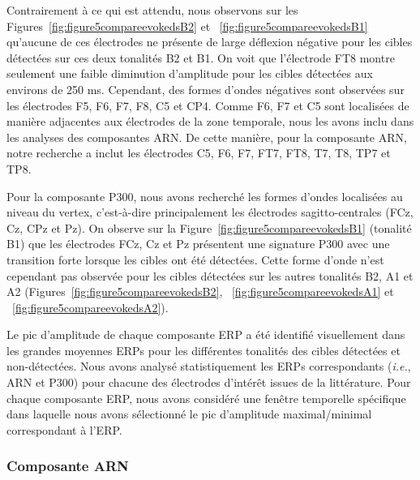 Contrairement à ce qui est attendu, nous observons sur les Figures~\ref{fig:figure5compareevokedsB2} et ~\ref{fig:figure5compareevokedsB1} qu'aucune de ces électrodes ne présente de large déflexion négative pour les cibles détectées sur ces deux tonalités B2 et B1. 
On voit que l'électrode FT8 montre seulement une faible diminution d'amplitude pour les cibles détectées aux environs de 250 ms. 
Cependant, des formes d'ondes négatives sont observées sur les électrodes F5, F6, F7, F8, C5 et CP4.  
Comme F6, F7 et C5 sont localisées de manière adjacentes aux électrodes de la zone temporale, nous les avons inclu dans les analyses des composantes ARN.
De cette manière, pour la composante ARN, notre recherche a inclut les électrodes C5, F6, F7, FT7, FT8, T7, T8, TP7 et TP8. 

Pour la composante P300, nous avons recherché les formes d'ondes localisées au niveau du vertex, c'est-à-dire principalement les électrodes sagitto-centrales (FCz, Cz, CPz et Pz). 
On observe sur la Figure~\ref{fig:figure5compareevokedsB1} (tonalité B1) que les électrodes FCz, Cz et Pz présentent une signature P300 avec une transition forte lorsque les cibles ont été détectées. 
Cette forme d'onde n'est cependant pas observée pour les cibles détectées sur les autres tonalités B2, A1 et A2 (Figures~\ref{fig:figure5compareevokedsB2}, ~\ref{fig:figure5compareevokedsA1} et ~\ref{fig:figure5compareevokedsA2}). 

Le pic d'amplitude de chaque composante ERP a été identifié visuellement dans les grandes moyennes ERPs pour les différentes tonalités des cibles détectées et non-détectées. 
Nous avons analysé statistiquement les ERPs correspondants (\textit{i.e.}, ARN et P300) pour chacune des électrodes d'intérêt issues de la littérature. 
Pour chaque composante ERP, nous avons considéré une fenêtre temporelle spécifique dans laquelle nous avons sélectionné le pic d'amplitude maximal/minimal correspondant à l'ERP. 

\newpage
\subsubsection{Composante ARN}

